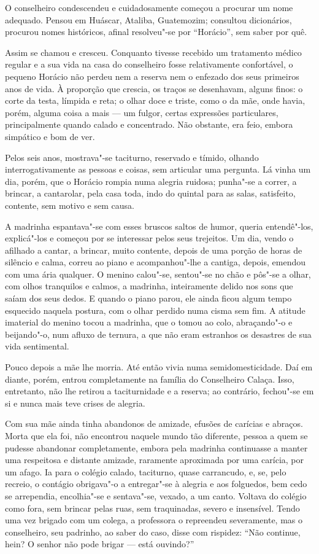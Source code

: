 O conselheiro condescendeu e cuidadosamente começou a procurar um nome
adequado. Pensou em Huáscar, Ataliba, Guatemozim; consultou dicionários,
procurou nomes históricos, afinal resolveu"-se por ``Horácio'', sem saber
por quê.

Assim se chamou e cresceu. Conquanto tivesse recebido um tratamento
médico regular e a sua vida na casa do conselheiro fosse relativamente
confortável, o pequeno Horácio não perdeu nem a reserva nem o enfezado
dos seus primeiros anos de vida. À proporção que crescia, os traços se
desenhavam, alguns finos: o corte da testa, límpida e reta; o olhar doce
e triste, como o da mãe, onde havia, porém, alguma coisa a mais --- um
fulgor, certas expressões particulares, principalmente quando calado e
concentrado. Não obstante, era feio, embora simpático e bom de ver.

Pelos seis anos, mostrava"-se taciturno, reservado e tímido, olhando
interrogativamente as pessoas e coisas, sem articular uma pergunta. Lá
vinha um dia, porém, que o Horácio rompia numa alegria ruidosa; punha"-se
a correr, a brincar, a cantarolar, pela casa toda, indo do quintal para
as salas, satisfeito, contente, sem motivo e sem causa.

A madrinha espantava"-se com esses bruscos saltos de humor, queria
entendê"-los, explicá"-los e começou por se interessar pelos seus
trejeitos. Um dia, vendo o afilhado a cantar, a brincar, muito contente,
depois de uma porção de horas de silêncio e calma, correu ao piano e
acompanhou"-lhe a cantiga, depois, emendou com uma ária qualquer. O
menino calou"-se, sentou"-se no chão e pôs"-se a olhar, com olhos
tranquilos e calmos, a madrinha, inteiramente delido nos sons que saíam
dos seus dedos. E quando o piano parou, ele ainda ficou algum tempo
esquecido naquela postura, com o olhar perdido numa cisma sem fim. A
atitude imaterial do menino tocou a madrinha, que o tomou ao colo,
abraçando"-o e beijando"-o, num afluxo de ternura, a que não eram
estranhos os desastres de sua vida sentimental.

Pouco depois a mãe lhe morria. Até então vivia numa semidomesticidade.
Daí em diante, porém, entrou completamente na família do Conselheiro
Calaça. Isso, entretanto, não lhe retirou a taciturnidade e a reserva;
ao contrário, fechou"-se em si e nunca mais teve crises de alegria.

Com sua mãe ainda tinha abandonos de amizade, efusões de carícias e
abraços. Morta que ela foi, não encontrou naquele mundo tão diferente,
pessoa a quem se pudesse abandonar completamente, embora pela madrinha
continuasse a manter uma respeitosa e distante amizade, raramente
aproximada por uma carícia, por um afago. Ia para o colégio calado,
taciturno, quase carrancudo, e, se, pelo recreio, o contágio obrigava"-o
a entregar"-se à alegria e aos folguedos, bem cedo se arrependia,
encolhia"-se e sentava"-se, vexado, a um canto. Voltava do colégio como
fora, sem brincar pelas ruas, sem traquinadas, severo e insensível.
Tendo uma vez brigado com um colega, a professora o repreendeu
severamente, mas o conselheiro, seu padrinho, ao saber do caso, disse
com rispidez: ``Não continue, hein? O senhor não pode brigar --- está
ouvindo?''

